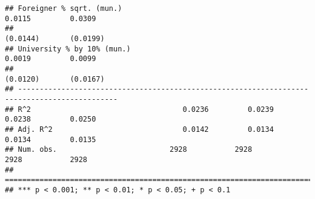 \documentclass[
]{article}
\begin{document}
\begin{verbatim}
## Foreigner % sqrt. (mun.)                                            0.0115         0.0309    
##                                                                    (0.0144)       (0.0199)   
## University % by 10% (mun.)                                          0.0019         0.0099    
##                                                                    (0.0120)       (0.0167)   
## ---------------------------------------------------------------------------------------------
## R^2                                   0.0236         0.0239         0.0238         0.0250    
## Adj. R^2                              0.0142         0.0134         0.0134         0.0135    
## Num. obs.                          2928           2928           2928           2928         
## =============================================================================================
## *** p < 0.001; ** p < 0.01; * p < 0.05; + p < 0.1
\end{verbatim}
\end{document}

